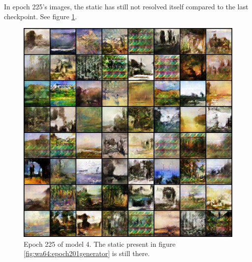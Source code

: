 \documentclass[11pt,letterpaper]{article}
\begin{document}
				In epoch 225's images, the static has still not resolved itself compared to the last checkpoint.
				See figure \ref{fig:wa64:epoch225generator}.
				\begin{figure}
					\centering
					\includegraphics[width=1.0\linewidth]{results/model4/epoch225_generator}
					\caption{Epoch 225 of model 4. The static present in figure \ref{fig:wa64:epoch201generator} is still there.}
					\label{fig:wa64:epoch225generator}
				\end{figure}
\end{document}
